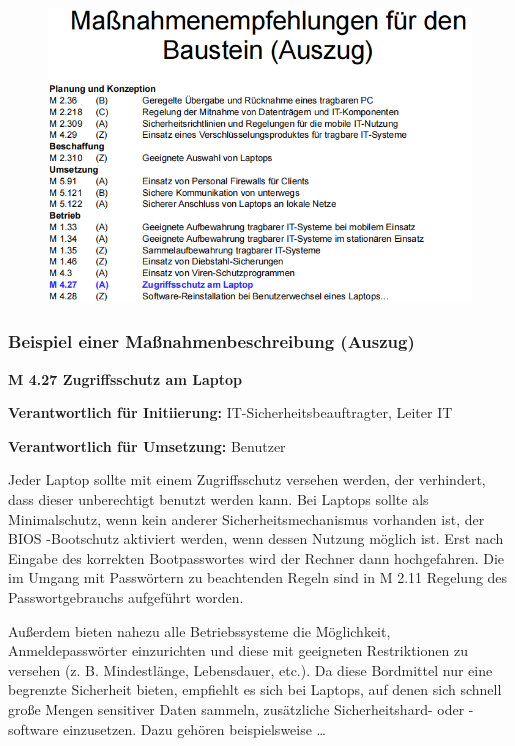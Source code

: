 \documentclass[openany]{book}
\begin{document}
\begin{figure}[h!]
    \centering
    \includegraphics[width=\linewidth]{Pics/MassnahmenEmpfehlungen.PNG}
\end{figure}

\newpage

\subsubsection{Beispiel einer Maßnahmenbeschreibung (Auszug)}

\textbf{M 4.27 Zugriffsschutz am Laptop} 

\textbf{Verantwortlich für Initiierung:} IT-Sicherheitsbeauftragter, Leiter IT 

\textbf{Verantwortlich für Umsetzung:} Benutzer 

Jeder Laptop sollte mit einem Zugriffsschutz versehen werden, der verhindert, dass dieser 
unberechtigt benutzt werden kann. Bei Laptops sollte als Minimalschutz, wenn kein anderer 
Sicherheitsmechanismus vorhanden ist, der BIOS -Bootschutz aktiviert werden, wenn dessen 
Nutzung möglich ist. Erst nach Eingabe des korrekten Bootpasswortes wird der Rechner 
dann hochgefahren. Die im Umgang mit Passwörtern zu beachtenden Regeln sind in M 2.11 
Regelung des Passwortgebrauchs aufgeführt worden.

Außerdem bieten nahezu alle Betriebssysteme die Möglichkeit, Anmeldepasswörter 
einzurichten und diese mit geeigneten Restriktionen zu versehen (z. B. Mindestlänge, 
Lebensdauer, etc.). Da diese Bordmittel nur eine begrenzte Sicherheit bieten, empfiehlt es 
sich bei Laptops, auf denen sich schnell große Mengen sensitiver Daten sammeln, 
zusätzliche Sicherheitshard- oder -software einzusetzen. Dazu gehören beispielsweise \dots
\end{document}
